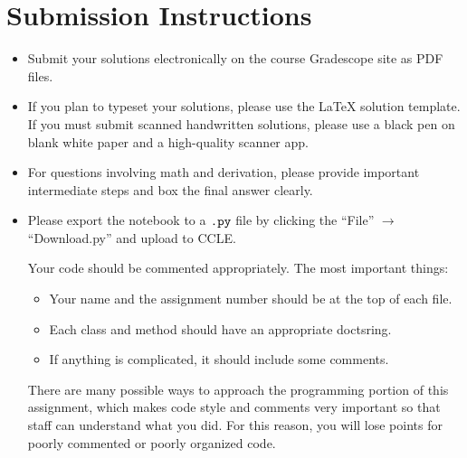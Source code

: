 \documentclass[11pt]{article}
\begin{document}
\author{}
\date{}
\maketitle
\vspace{-0.75in}

\vspace{-11pt}

\ifsoln
\else
\section*{Submission Instructions}
\begin{itemize}
\item 
Submit your solutions electronically on the course Gradescope site as PDF files.
\item If you plan to typeset your solutions, please use the LaTeX solution template. If you must submit scanned handwritten solutions, please use a black pen on blank white paper and a high-quality scanner app.
\item For questions involving math and derivation, please provide important intermediate steps and box the final answer clearly.
\end{itemize}

\begin{itemize}
\item Please export the notebook to a $\verb|.py|$ file by clicking the “File” $\rightarrow$ “Download.py” and upload to CCLE. 

Your code should be commented appropriately. The most important things:
\vspace{-\parskip}
\begin{itemize}[nosep]
\item Your name and the assignment number should be at the top of each file.
\item Each class and method should have an appropriate doctsring.
\item If anything is complicated, it should include some comments.
\end{itemize}
\vspace{-\parskip}
There are many possible ways to approach the programming portion of this assignment, which makes code style and comments very important so that staff can understand what you did. For this reason, you will lose points for poorly commented or poorly organized code.
\end{itemize}
\end{document}
